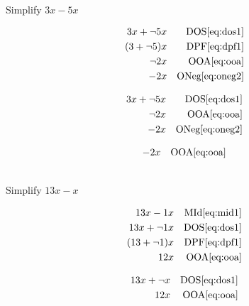\documentclass[20150903-160354-rs2.2-MarksMathNotebook.tex]{subfiles}
\begin{document}
\begin{example}[id:20141121-193636] \label{20141121-193636} \hfill \\

Simplify $3x-5x$

\soln

\solnsteps
\begin{align*}
3x + \neg 5x && \text{DOS} \eqref{eq:dos1} \\
(3+ \neg 5)x && \text{DPF} \eqref{eq:dpf1} \\
\neg 2x && \text{OOA} \eqref{eq:ooa} \\
-2x && \text{ONeg} \eqref{eq:oneg2}
\end{align*}

\soln

\lesssteps
\begin{align*}
3x + \neg 5x && \text{DOS} \eqref{eq:dos1} \\
\neg 2x && \text{OOA} \eqref{eq:ooa} \\
-2x && \text{ONeg} \eqref{eq:oneg2}
\end{align*}

\soln

\lesssteps
\begin{align*}
-2x && \text{OOA} \eqref{eq:ooa}
\end{align*}

\end{example}

\begin{example}[id:20141106-150622] \label{20141106-150622}  \hfill \\

Simplify $13x-x$

\soln

\solnsteps
\begin{align*}
13x-1x && \text{MId} \eqref{eq:mid1} \\
13x+\neg 1x && \text{DOS} \eqref{eq:dos1} \\
(13+\neg 1)x && \text{DPF} \eqref{eq:dpf1} \\
12x && \text{OOA} \eqref{eq:ooa}
\end{align*}

\soln

\lesssteps
\begin{align*}
13x + \neg x && \text{DOS} \eqref{eq:dos1} \\
12 x && \text{OOA} \eqref{eq:ooa}
\end{align*}
\end{example}
\end{document}
